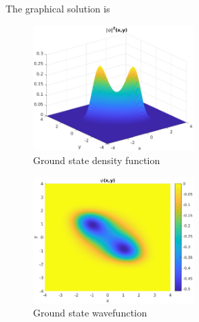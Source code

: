 \documentclass{article}
\theoremstyle{definition}
\begin{document}
\begin{enumerate}[label=(\alph*)]
	The graphical solution is 
	\begin{figure}[!htb]
		\centering
		\includegraphics[width=0.55\textwidth]{problem3d1.eps}
		\caption{Ground state density function}
	\end{figure}
	
	\begin{figure}[!htb]
		\centering
		\includegraphics[width=0.55\textwidth]{problem3d2.eps}
		\caption{Ground state wavefunction}
	\end{figure}
	
	
	
\end{enumerate}

	
\end{document}
